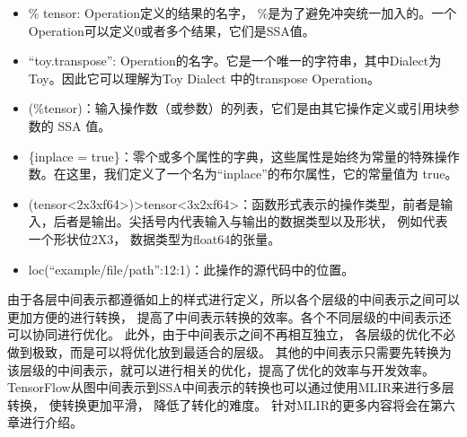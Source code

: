 \documentclass[letterpaper,10pt,english]{sphinxmanual}
\begin{document}
\begin{sphinxVerbatim}[commandchars=\\\{\}]
          
\end{sphinxVerbatim}
\begin{itemize}
\item {} 
\sphinxAtStartPar
\% tensor: Operation定义的结果的名字，
\(\%\)是为了避免冲突统一加入的。一个Operation可以定义0或者多个结果，它们是SSA值。

\item {} 
\sphinxAtStartPar
“toy.transpose”:
Operation的名字。它是一个唯一的字符串，其中Dialect为Toy。因此它可以理解为Toy
Dialect 中的transpose Operation。

\item {} 
\sphinxAtStartPar
(\%tensor)：输入操作数（或参数）的列表，它们是由其它操作定义或引用块参数的
SSA 值。

\item {} 
\sphinxAtStartPar
\{inplace =
true\}：零个或多个属性的字典，这些属性是始终为常量的特殊操作数。在这里，我们定义了一个名为“inplace”的布尔属性，它的常量值为
true。

\item {} 
\sphinxAtStartPar
(tensor<2x3xf64>)\sphinxhyphen{}>tensor<3x2xf64>：函数形式表示的操作类型，前者是输入，后者是输出。尖括号内代表输入与输出的数据类型以及形状，
例如\(<2x3xf64>\)代表一个形状位2X3，
数据类型为float64的张量。

\item {} 
\sphinxAtStartPar
loc(“example/file/path”:12:1)：此操作的源代码中的位置。

\end{itemize}

\sphinxAtStartPar
由于各层中间表示都遵循如上的样式进行定义，所以各个层级的中间表示之间可以更加方便的进行转换，
提高了中间表示转换的效率。各个不同层级的中间表示还可以协同进行优化。
此外，由于中间表示之间不再相互独立，
各层级的优化不必做到极致，而是可以将优化放到最适合的层级。
其他的中间表示只需要先转换为该层级的中间表示，就可以进行相关的优化，提高了优化的效率与开发效率。TensorFlow从图中间表示到SSA中间表示的转换也可以通过使用MLIR来进行多层转换，
使转换更加平滑， 降低了转化的难度。
针对MLIR的更多内容将会在第六章进行介绍。
\end{document}
